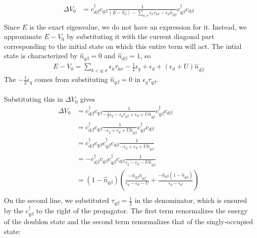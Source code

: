 \documentclass[twoside,11pt]{report}
\numberwithin{equation}{section}
\begin{document}
\begin{equation}\begin{aligned}
	\Delta V_0 &=  c^\dagger_{d\beta}c_{q\beta}\frac{1}{\left(E - V_0\right) - \sum_{k,\sigma}\epsilon_k \tau_{k\sigma} - \epsilon_d \hat n_{d\overline\beta}}c^\dagger_{q\beta}c_{d\beta}\\
\end{aligned}\end{equation}
Since \(E\) is the exact eigenvalue, we do not have an expression for it. Instead, we approximate \(E - V_0\) by substituting it with the current diagonal part corresponding to the initial state on which this entire term will act. The intial state is characterized by \(\hat n_{q\beta}=0\) and \(\hat n_{d\beta} = 1\), so
\begin{equation}\begin{aligned}
	E - V_0= \sum_{k<q,\sigma}\epsilon_k \tau_{k\sigma} - \frac{1}{2}\epsilon_q + \epsilon_d + \left(\epsilon_d + U\right)\hat n_{d\overline\beta}
\end{aligned}\end{equation}
The \(- \frac{1}{2}\epsilon_q\) comes from substituting \(\hat n_{q\beta}=0\) in \(\epsilon_q \tau_{q\beta}\).
\\\\ Substituting this in \(\Delta V_0\) gives
\begin{equation}\begin{aligned}
\Delta V_0 &=  c^\dagger_{d\beta}c_{q\beta}\frac{1}{-\frac{1}{2}\epsilon_q -\epsilon_q \tau_{q\beta} + \epsilon_d + U\hat n_{d\overline\beta}}c^\dagger_{q\beta}c_{d\beta}\\
&=  c^\dagger_{d\beta}c_{q\beta}\frac{1}{-\epsilon_q + \epsilon_d + U\hat n_{d\overline\beta}}c^\dagger_{q\beta}c_{d\beta}\\
&=  c^\dagger_{d\beta}c_{q\beta}c^\dagger_{q\beta}c_{d\beta}\frac{1}{-\epsilon_q + \epsilon_d + U\hat n_{d\overline\beta}}\\
&=  -c^\dagger_{d\beta}c_{q\beta}c^\dagger_{q\beta}c_{d\beta}\frac{1}{\epsilon_q - \epsilon_d - U\hat n_{d\overline\beta}}\\
&=  \left(1 - \hat n_{q\beta}\right)\left(\frac{-\hat n_{d\beta}\hat n_{d\overline\beta}}{\epsilon_q - \epsilon_d - U} + \frac{-\hat n_{d\beta}\left(1 - \hat n_{d\overline\beta}\right)}{\epsilon_q - \epsilon_d}\right)\\
\end{aligned}\end{equation}
On the second line, we substituted \(\tau_{q\beta} = \frac{1}{2}\) in the denominator, which is ensured by the \(c^\dagger_{q\beta}\) to the right of the propagator. The first term renormalizes the energy of the doublon state and the second term renormalizes that of the singly-occupied state:
\end{document}
